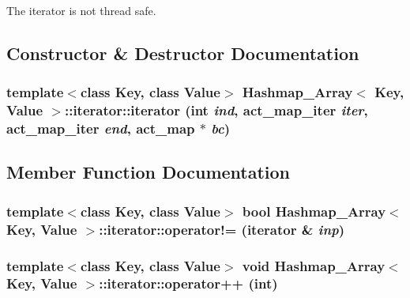 The iterator is not thread safe. 

\subsection{Constructor \& Destructor Documentation}
\hypertarget{class_hashmap___array_1_1iterator_a57e9420ce0c860a340b17e78228921df}{
\subsubsection[{iterator}]{\setlength{\rightskip}{0pt plus 5cm}template$<$class Key, class Value$>$ {\bf Hashmap\_\-Array}$<$ Key, Value $>$::iterator::iterator (int {\em ind}, \/  {\bf act\_\-map\_\-iter} {\em iter}, \/  {\bf act\_\-map\_\-iter} {\em end}, \/  {\bf act\_\-map} $\ast$ {\em bc})}}
\label{class_hashmap___array_1_1iterator_a57e9420ce0c860a340b17e78228921df}


\subsection{Member Function Documentation}
\hypertarget{class_hashmap___array_1_1iterator_ac18682a8d625a1ba866609c625debcdb}{
\subsubsection[{operator!=}]{\setlength{\rightskip}{0pt plus 5cm}template$<$class Key, class Value$>$ bool {\bf Hashmap\_\-Array}$<$ Key, Value $>$::iterator::operator!= ({\bf iterator} \& {\em inp})}}
\label{class_hashmap___array_1_1iterator_ac18682a8d625a1ba866609c625debcdb}
\hypertarget{class_hashmap___array_1_1iterator_aeb410c0c1c0a8124273849f102eff076}{
\subsubsection[{operator++}]{\setlength{\rightskip}{0pt plus 5cm}template$<$class Key, class Value$>$ void {\bf Hashmap\_\-Array}$<$ Key, Value $>$::iterator::operator++ (int)}}
\label{class_hashmap___array_1_1iterator_aeb410c0c1c0a8124273849f102eff076}


